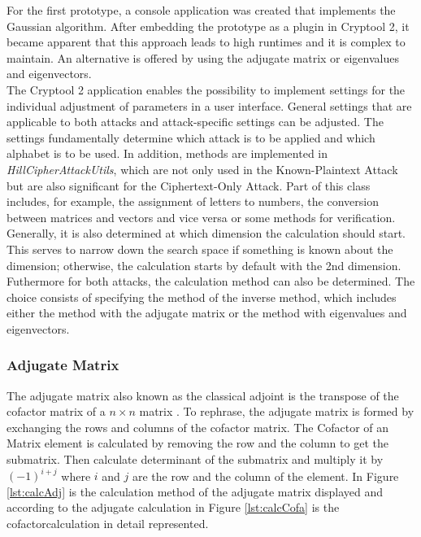 \documentclass[conference]{IEEEtran}
\begin{document}
For the first prototype, a console application was created that implements the Gaussian algorithm. After embedding the prototype as a plugin in Cryptool 2, it became apparent that this approach leads to high runtimes and it is complex to maintain. An alternative is offered by using the adjugate matrix or eigenvalues and eigenvectors.
\\
The Cryptool 2 application enables the possibility to implement settings for the individual adjustment of parameters in a user interface. General settings that are applicable to both attacks and attack-specific settings can be adjusted. The settings fundamentally determine which attack is to be applied and which alphabet is to be used. In addition, methods are implemented in \textit{HillCipherAttackUtils}, which are not only used in the Known-Plaintext Attack but are also significant for the Ciphertext-Only Attack. Part of this class includes, for example, the assignment of letters to numbers, the conversion between matrices and vectors and vice versa or some methods for verification.
\\
Generally, it is also determined at which dimension the calculation should start. This serves to narrow down the search space if something is known about the dimension; otherwise, the calculation starts by default with the 2nd dimension.
Futhermore for both attacks, the calculation method can also be determined. The choice consists of specifying the method of the inverse method, which includes either the method with the adjugate matrix or the method with eigenvalues and eigenvectors.
\\

\subsubsection{Adjugate Matrix}

The adjugate matrix also known as the classical adjoint is the transpose of the cofactor matrix of a \( n \times n \) matrix \cite{b4}. To rephrase, the adjugate matrix is formed by exchanging the rows and columns of the cofactor matrix.
The Cofactor of an Matrix element is calculated by removing the row and the column to get the submatrix. Then calculate determinant of the submatrix and multiply it by \((-1)^{i+j}\) where \(i\) and \(j\) are the row and the column of the element. 
In Figure \ref{lst:calcAdj} is the calculation method of the adjugate matrix displayed and according to the adjugate calculation in Figure \ref{lst:calcCofa} is the cofactorcalculation in detail represented.
\\
\end{document}
